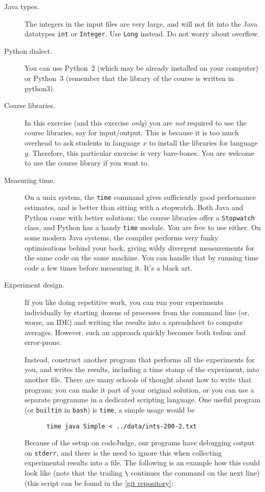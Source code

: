 \documentclass{tufte-handout}
\begin{document}
\begin{description}
  \item[Java types.] The integers in the input files are very large, and will not fit into the Java datatypes \texttt{int} or \texttt{Integer}.
    Use \texttt{Long} instead.
    Do not worry about overflow.
  \item[Python dialect.] You can use Python~2 (which may be already installed on your computer) or Python~3 (remember that the library of the course is written in python3).
  \item[Course libraries.]
    In this exercise (and this exercise \emph{only}) you are \emph{not} required to use the course libraries, say for input/output.
    This is because it is too much overhead to ask students in language $x$ to install the libraries for language $y$.
    Therefore, this particular exercise is very bare-bones.
    You are welcome to use the course library if you want to.
  \item[Measuring time.]
    On a unix system, the \texttt{time} command gives sufficiently good performance estimates, and is better than sitting with a stopwatch.
    Both Java and Python come with better solutions; the course libraries offer a \texttt{Stopwatch} class, and Python has a handy \texttt{time} module. You are free to use either. 
    On some modern Java systems, the compiler performs very funky optimisations behind your back, giving wildy divergent measurements for the same code on the same machine.
    You can handle that by running time code a few times before measuring it.
    It’s a black art.
  \item[Experiment design.]
    If you like doing repetitive work, you  can run your experiments individually by starting dozens of processes from the command line (or, worse, an IDE) and writing the results into a spreadsheet to compute averages.
    However, such an approach quickly becomes both tedius and error-prone.

    Instead, construct another program that performs all the experiments for you, and writes the results, including a time stamp of the experiment, into another file.
    There are many schools of thought about how to write that program; you can make it part of your original solution, or you can use a separate programme in a dedicated scripting language.
    One useful program (or \texttt{builtin} in \texttt{bash}) is \texttt{time}, a simple usage would be 
    \begin{lstlisting}
      time java Simple < ../data/ints-200-2.txt
    \end{lstlisting}
    Because of the setup on codeJudge, our programs have debugging output on \texttt{stderr}, and there is the need to ignore this when collecting experimental results into a file. 
    The following is an example how this could look like (note that the trailing \verb+\+ continues the command on the next line) (this script can be found in the \href{https://bitbucket.org/rikj/bads-labs/src/master/foursum/src/simpleExp.sh}{[git repository]}:
    


\end{description}
\end{document}
